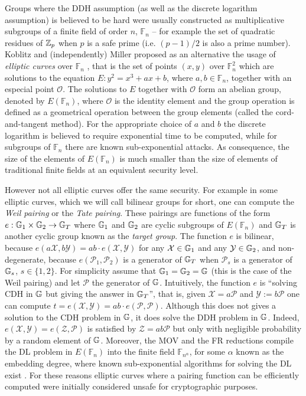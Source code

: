 Groups where the DDH assumption (as well as the discrete logarithm assumption) is believed to be hard were usually constructed as multiplicative subgroups of a finite field of order $n$, $\mathbb{F}_n$ -- for example the set of {quadratic residues} of $\mathbb{Z}_p$ when $p$ is a safe prime (i.e. $(p-1)/2$ is also a prime number).
Koblitz and (independently) Miller proposed as an alternative the usage of \emph{elliptic curves} over $\mathbb{F}_n$ \cite{MOC:Koblitz87,C:Miller85}, that is the set of points $(x,y)$ over $\mathbb{F}_n^2$ which are solutions to the equation $E:y^2=x^3+ax+b$, where $a,b\in\mathbb{F}_n$, together with an especial point $\mathcal{O}$. The solutions to $E$ together with $\mathcal{O}$ form an abelian group, denoted by $E(\mathbb{F}_n)$, where $\mathcal{O}$ is the identity element and the group operation is defined as a geometrical operation between the group elements (called the cord-and-tangent method). For the appropriate choice of $a$ and $b$ the discrete logarithm is believed to require exponential time to be computed, while for subgroups of $\mathbb{F}_n$  there are known sub-exponential attacks. As consequence, the size of the elements of $E(\mathbb{F}_n)$ is much smaller than the size of elements of traditional finite fields at an equivalent security level.

However not all elliptic curves offer the same security. For example in some elliptic curves, which we will call bilinear groups for short, one can compute the \emph{Weil pairing} or the \emph{Tate pairing}. These {pairings} are functions of the form $e:\mathbb{G}_1\times\mathbb{G}_2\to\mathbb{G}_T$ where $\mathbb{G}_1$ and $\mathbb{G}_2$ are cyclic subgroups of $E(\mathbb{F}_n)$ and $\mathbb{G}_T$ is another cyclic group known as the \emph{target group}. The function $e$ is {bilinear}, because $e(a\mathcal{X},b\mathcal{Y})=ab\cdot e(\mathcal{X},\mathcal{Y})$ for any $\mathcal{X}\in\mathbb{G}_1$ and any $\mathcal{Y}\in\mathbb{G}_2$, and {non-degenerate}, because $e(\mathcal{P}_1,\mathcal{P}_2)$ is a generator of $\mathbb{G}_T$ when $\mathcal{P}_s$ is a generator of $\mathbb{G}_s$, $s\in\{1,2\}$. For simplicity assume that $\mathbb{G}_1=\mathbb{G}_2=\mathbb{G}$ (this is the case of the Weil pairing) and let $\mathcal{P}$ the generator of $\mathbb{G}$. Intuitively, the function $e$ is ``solving CDH in $\mathbb{G}$ but giving the answer in $\mathbb{G}_T$'', that is, given $\mathcal{X}=a\mathcal{P}$ and $\mathcal{Y}:=b\mathcal{P}$ one can compute $t=e(\mathcal{X},\mathcal{Y})=ab\cdot e(\mathcal{P},\mathcal{P})$. Although this does not gives a solution to the CDH problem in $\mathbb{G}$, it does solve the DDH problem in $\mathbb{G}$. Indeed, $e(\mathcal{X},\mathcal{Y})=e(\mathcal{Z},\mathcal{P})$ is satisfied by $\mathcal{Z}=ab\mathcal{P}$ but only with negligible probability by a random element of $\mathbb{G}$. 
Moreover, the MOV and the FR reductions compile the DL problem in $E(\mathbb{F}_n)$ into the finite field $\mathbb{F}_{n^\alpha}$, for some $\alpha$ known as the {embedding degree}, where known sub-exponential algorithms for solving the DL exist \cite{STOC:MenVanOka91,MOC:FreRuc94}.
For these reasons elliptic curves where a pairing function can be efficiently computed were initially considered unsafe for cryptographic purposes.

